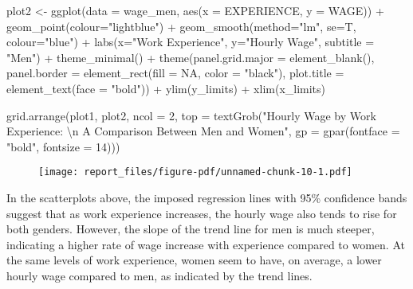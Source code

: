 \documentclass[
  letterpaper,
  DIV=11,
  numbers=noendperiod]{scrartcl}
\newenvironment{Shaded}{\begin{snugshade}}{\end{snugshade}}
\newcommand{\AttributeTok}[1]{\textcolor[rgb]{0.40,0.45,0.13}{#1}}
\newcommand{\ConstantTok}[1]{\textcolor[rgb]{0.56,0.35,0.01}{#1}}
\newcommand{\DecValTok}[1]{\textcolor[rgb]{0.68,0.00,0.00}{#1}}
\newcommand{\FunctionTok}[1]{\textcolor[rgb]{0.28,0.35,0.67}{#1}}
\newcommand{\NormalTok}[1]{\textcolor[rgb]{0.00,0.23,0.31}{#1}}
\newcommand{\OtherTok}[1]{\textcolor[rgb]{0.00,0.23,0.31}{#1}}
\newcommand{\SpecialCharTok}[1]{\textcolor[rgb]{0.37,0.37,0.37}{#1}}
\newcommand{\StringTok}[1]{\textcolor[rgb]{0.13,0.47,0.30}{#1}}
\begin{document}
\begin{Shaded}
\begin{Highlighting}[]
\NormalTok{plot2 }\OtherTok{\textless{}{-}} \FunctionTok{ggplot}\NormalTok{(}\AttributeTok{data =}\NormalTok{ wage\_men, }\FunctionTok{aes}\NormalTok{(}\AttributeTok{x =}\NormalTok{ EXPERIENCE, }\AttributeTok{y =}\NormalTok{ WAGE)) }\SpecialCharTok{+}
  \FunctionTok{geom\_point}\NormalTok{(}\AttributeTok{colour=}\StringTok{"lightblue"}\NormalTok{) }\SpecialCharTok{+} 
  \FunctionTok{geom\_smooth}\NormalTok{(}\AttributeTok{method=}\StringTok{"lm"}\NormalTok{, }\AttributeTok{se=}\NormalTok{T, }\AttributeTok{colour=}\StringTok{"blue"}\NormalTok{) }\SpecialCharTok{+} 
  \FunctionTok{labs}\NormalTok{(}\AttributeTok{x=}\StringTok{"Work Experience"}\NormalTok{, }\AttributeTok{y=}\StringTok{"Hourly Wage"}\NormalTok{, }\AttributeTok{subtitle =} \StringTok{"Men"}\NormalTok{) }\SpecialCharTok{+}
  \FunctionTok{theme\_minimal}\NormalTok{() }\SpecialCharTok{+}
  \FunctionTok{theme}\NormalTok{(}\AttributeTok{panel.grid.major =} \FunctionTok{element\_blank}\NormalTok{(), }
        \AttributeTok{panel.border =} \FunctionTok{element\_rect}\NormalTok{(}\AttributeTok{fill =} \ConstantTok{NA}\NormalTok{, }\AttributeTok{color =} \StringTok{"black"}\NormalTok{),}
        \AttributeTok{plot.title =} \FunctionTok{element\_text}\NormalTok{(}\AttributeTok{face =} \StringTok{"bold"}\NormalTok{)) }\SpecialCharTok{+}
  \FunctionTok{ylim}\NormalTok{(y\_limits) }\SpecialCharTok{+}
  \FunctionTok{xlim}\NormalTok{(x\_limits)}

\FunctionTok{grid.arrange}\NormalTok{(plot1, plot2, }\AttributeTok{ncol =} \DecValTok{2}\NormalTok{, }
             \AttributeTok{top =} \FunctionTok{textGrob}\NormalTok{(}\StringTok{"Hourly Wage by Work Experience: }
\StringTok{                            }\SpecialCharTok{\textbackslash{}n}\StringTok{ A Comparison Between Men and Women"}\NormalTok{, }
                            \AttributeTok{gp =} \FunctionTok{gpar}\NormalTok{(}\AttributeTok{fontface =} \StringTok{"bold"}\NormalTok{, }\AttributeTok{fontsize =} \DecValTok{14}\NormalTok{)))}
\end{Highlighting}
\end{Shaded}

\begin{figure}[H]

{\centering \texttt{[image: report\_files/figure-pdf/unnamed-chunk-10-1.pdf]}

}

\end{figure}

In the scatterplots above, the imposed regression lines with 95\%
confidence bands suggest that as work experience increases, the hourly
wage also tends to rise for both genders. However, the slope of the
trend line for men is much steeper, indicating a higher rate of wage
increase with experience compared to women. At the same levels of work
experience, women seem to have, on average, a lower hourly wage compared
to men, as indicated by the trend lines.
\end{document}
